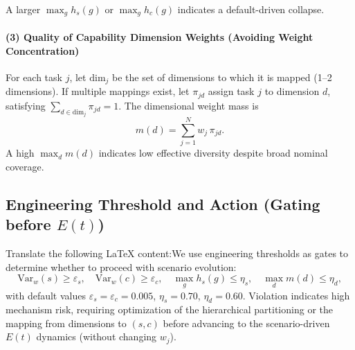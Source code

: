 A larger $\max_g h_s(g)$ or $\max_g h_c(g)$ indicates a default-driven collapse.\paragraph{(3) Quality of Capability Dimension Weights (Avoiding Weight Concentration)}For each task $j$, let $\mathrm{dim}_j$ be the set of dimensions to which it is mapped (1--2 dimensions).  
If multiple mappings exist, let $\pi_{j d}$ assign task $j$ to dimension $d$, satisfying $\sum_{d\in\mathrm{dim}_j}\pi_{j d}=1$.  
The dimensional weight mass is  
\begin{equation}
    m(d)=\sum_{j=1}^{N} w_j\,\pi_{j d}.
\end{equation}
A high $\max_d m(d)$ indicates low effective diversity despite broad nominal coverage.\subsection{Engineering Threshold and Action (Gating before $E(t)$)}Translate the following LaTeX content:We use engineering thresholds as gates to determine whether to proceed with scenario evolution:
\begin{equation}
\mathrm{Var}_w(s)\ge \varepsilon_s,\quad
\mathrm{Var}_w(c)\ge \varepsilon_c,\quad
\max_g h_s(g)\le \eta_s,\quad
\max_d m(d)\le \eta_d,
\end{equation}
with default values $\varepsilon_s=\varepsilon_c=0.005$, $\eta_s=0.70$, $\eta_d=0.60$.
Violation indicates high mechanism risk, requiring optimization of the hierarchical partitioning or the mapping from dimensions to $(s,c)$ before advancing to the scenario-driven $E(t)$ dynamics (without changing $w_j$).
